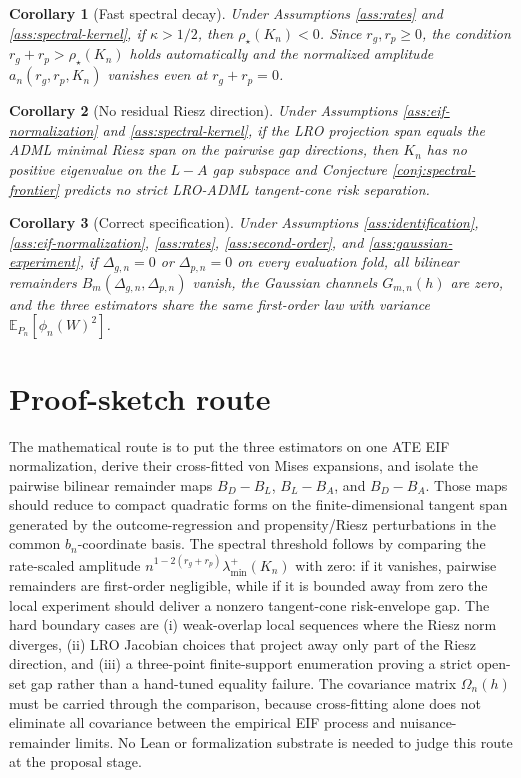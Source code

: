 \documentclass[11pt]{article}
\newcommand{\E}{\mathbb{E}}
\theoremstyle{definition}
\theoremstyle{plain}
\newtheorem{corollary}{Corollary}
\theoremstyle{remark}
\begin{document}
\begin{corollary}[Fast spectral decay]\label{cor:fast-spectral-decay}
Under Assumptions \ref{ass:rates} and \ref{ass:spectral-kernel}, if
\(\kappa>1/2\), then \(\rho_\star(K_n)<0\).  Since \(r_g,r_p\ge0\), the
condition \(r_g+r_p>\rho_\star(K_n)\) holds automatically and the normalized
amplitude \(a_n(r_g,r_p,K_n)\) vanishes even at \(r_g+r_p=0\).
\end{corollary}

\begin{corollary}[No residual Riesz direction]\label{cor:no-gap}
Under Assumptions \ref{ass:eif-normalization} and \ref{ass:spectral-kernel}, if
the LRO projection span equals the ADML minimal Riesz span on the pairwise
gap directions, then \(K_n\) has no positive eigenvalue on the \(L-A\) gap
subspace and Conjecture \ref{conj:spectral-frontier} predicts no strict
LRO-ADML tangent-cone risk separation.
\end{corollary}

\begin{corollary}[Correct specification]\label{cor:correct-spec}
Under Assumptions \ref{ass:identification}, \ref{ass:eif-normalization},
\ref{ass:rates}, \ref{ass:second-order}, and \ref{ass:gaussian-experiment}, if
\(\Delta_{g,n}=0\) or \(\Delta_{p,n}=0\) on every evaluation fold, all bilinear
remainders \(B_m(\Delta_{g,n},\Delta_{p,n})\) vanish, the Gaussian channels
\(G_{m,n}(h)\) are zero, and the three estimators share the same first-order
law with variance \(\E_{P_n}[\phi_n(W)^2]\).
\end{corollary}

\section{Proof-sketch route}
The mathematical route is to put the three estimators on one ATE EIF
normalization, derive their cross-fitted von Mises expansions, and isolate the
pairwise bilinear remainder maps \(B_D-B_L\), \(B_L-B_A\), and \(B_D-B_A\).
Those maps should reduce to compact quadratic forms on the finite-dimensional
tangent span generated by the outcome-regression and propensity/Riesz
perturbations in the common \(b_n\)-coordinate basis.  The spectral threshold
follows by comparing the rate-scaled amplitude
\(n^{1-2(r_g+r_p)}\lambda_{\min}^+(K_n)\) with zero: if it vanishes, pairwise
remainders are first-order negligible, while if it is bounded away from zero
the local experiment should deliver a nonzero tangent-cone risk-envelope gap.  The
hard boundary cases are (i) weak-overlap
local sequences where the Riesz norm diverges, (ii) LRO Jacobian choices that
project away only part of the Riesz direction, and (iii) a three-point
finite-support enumeration proving a strict open-set gap rather than a
hand-tuned equality failure.  The covariance matrix \(\Omega_n(h)\) must be
carried through the comparison, because cross-fitting alone does not eliminate
all covariance between the empirical EIF process and nuisance-remainder limits.
No Lean or formalization substrate is needed to
judge this route at the proposal stage.
\end{document}
